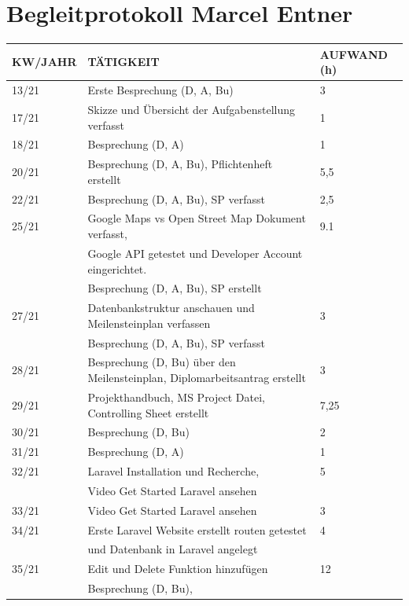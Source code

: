 \section{Begleitprotokoll Marcel Entner}
\begin{table}[h]
	\begin{tabular}{|l|l|l|}
		\hline
		\textbf{KW/JAHR} &     \textbf{TÄTIGKEIT}  & 	\textbf{AUFWAND (h)}    \\ \hline
		
		13/21   & Erste Besprechung (D, A, Bu) & 3 	\\ \hline
		17/21   & Skizze und Übersicht der Aufgabenstellung verfasst  & 1 	\\ \hline
		18/21   & Besprechung (D, A)  & 1 	\\ \hline
		20/21   & Besprechung (D, A, Bu), Pflichtenheft erstellt & 5,5 	\\ \hline
		22/21   & Besprechung (D, A, Bu), SP verfasst & 2,5 	\\ \hline
		25/21   & Google Maps vs Open Street Map Dokument verfasst,  & 9.1  \\
				& Google API getestet und Developer Account eingerichtet. & \\
				& Besprechung (D, A, Bu), SP erstellt & \\ \hline	
		27/21   & Datenbankstruktur anschauen und Meilensteinplan verfassen  & 3 \\
		& Besprechung (D, A, Bu), SP verfasst & 	\\ \hline		
		28/21   & Besprechung (D, Bu) über den Meilensteinplan, Diplomarbeitsantrag erstellt  & 3 \\ \hline		
		29/21   & Projekthandbuch, MS Project Datei, Controlling Sheet erstellt & 7,25 	\\ \hline
		30/21   & Besprechung (D, Bu) & 2 	\\ \hline
		31/21   & Besprechung (D, A)& 1	\\ \hline
		32/21   & Laravel Installation und Recherche,  & 5	\\ 
				& Video Get Started Laravel ansehen &\\ \hline
		33/21   &  Video Get Started Laravel ansehen & 3	\\ \hline
		34/21   & Erste Laravel Website erstellt routen getestet & 4	\\ 
				& und Datenbank in Laravel angelegt &\\\hline
		35/21   & Edit und Delete Funktion hinzufügen  & 12 \\ 
				& Besprechung (D, Bu),&	\\ 

\end{tabular}
\end{table}
